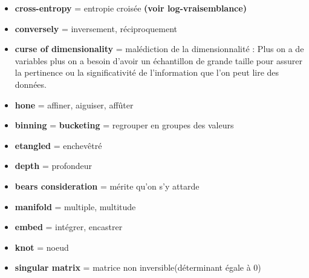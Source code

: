 \documentclass[french]{article}
\begin{document}
\begin{itemize}[label=\textbullet]
	\item \textbf{cross-entropy} = entropie croisée \textbf{(voir log-vraisemblance)}
	\item \textbf{conversely} = inversement, réciproquement
	\item \textbf{curse of dimensionality} = malédiction de la dimensionnalité : Plus on a de variables plus on a besoin d'avoir un échantillon de grande taille pour assurer la pertinence ou la significativité de l’information que l’on peut lire des données. 
	\item \textbf{hone} = affiner, aiguiser, affûter
	\item \textbf{binning} = \textbf{bucketing} = regrouper en groupes des valeurs
	\item \textbf{etangled} = enchevêtré
	\item \textbf{depth} = profondeur
	\item \textbf{bears consideration} = mérite qu'on s'y attarde
	\item \textbf{manifold} = multiple, multitude
	\item \textbf{embed} = intégrer, encastrer
	\item \textbf{knot} = noeud
	\item \textbf{singular matrix} = matrice non inversible(déterminant égale à 0)	\\
\end{itemize}
\end{document}

